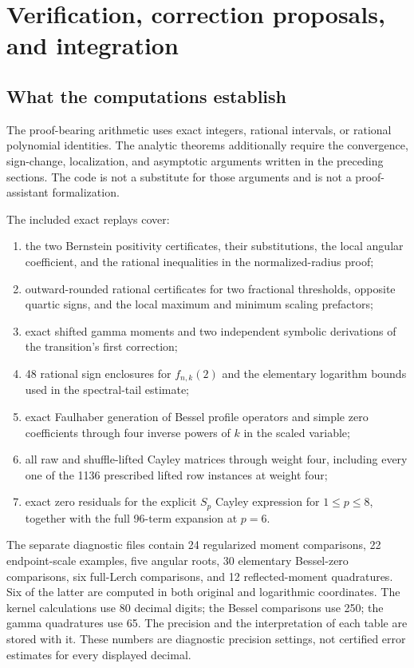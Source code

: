 \section{Verification, correction proposals, and integration}
\label{sec:verification}

\subsection{What the computations establish}
The proof-bearing arithmetic uses exact integers, rational intervals,
or rational polynomial identities. The analytic theorems additionally
require the convergence, sign-change, localization, and asymptotic
arguments written in the preceding sections. The code is not a substitute
for those arguments and is not a proof-assistant formalization.

The included exact replays cover:
\begin{enumerate}
\item the two Bernstein positivity certificates, their substitutions,
the local angular coefficient, and the rational inequalities in the
normalized-radius proof;
\item outward-rounded rational certificates for two fractional
thresholds, opposite quartic signs, and the local maximum and minimum
scaling prefactors;
\item exact shifted gamma moments and two independent symbolic
derivations of the transition's first correction;
\item 48 rational sign enclosures for $f_{n,k}(2)$ and the elementary
logarithm bounds used in the spectral-tail estimate;
\item exact Faulhaber generation of Bessel profile operators and simple
zero coefficients through four inverse powers of $k$ in the scaled
variable;
\item all raw and shuffle-lifted Cayley matrices through weight four,
including every one of the 1136 prescribed lifted row instances at
weight four;
\item exact zero residuals for the explicit $S_p$ Cayley expression for
$1\le p\le8$, together with the full 96-term expansion at $p=6$.
\end{enumerate}

The separate diagnostic files contain 24 regularized moment comparisons,
22 endpoint-scale examples, five angular roots, 30 elementary Bessel-zero
comparisons, six full-Lerch comparisons, and 12 reflected-moment
quadratures. Six of the latter are computed in both original and
logarithmic coordinates. The kernel calculations use 80 decimal digits;
the Bessel comparisons use 250; the gamma quadratures use 65.
The precision and the interpretation of each table are stored with it.
These numbers are diagnostic precision settings, not certified error
estimates for every displayed decimal.

